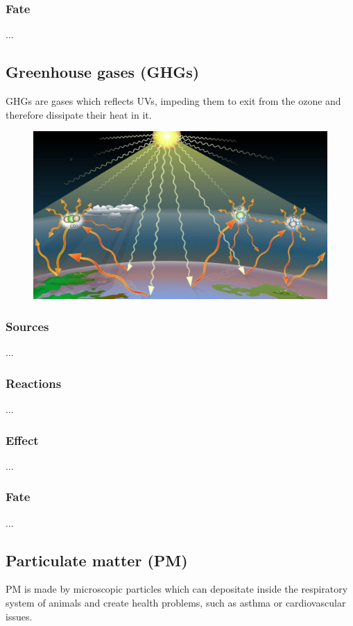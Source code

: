 \documentclass{article}
\newcommand{\cfig}[1]{%
  \begin{figure}[ht!]%
    \centering%
    #1%
  \end{figure}%
}
\begin{document}
\subsubsection{Fate}
... 

\subsection{Greenhouse gases (GHGs)}
GHGs are gases which reflects UVs, impeding them to exit from the ozone
and therefore dissipate their heat in it.

\cfig{\includegraphics*[width=.8\textwidth]{media/Treibhauseffekt-Graphik.jpg}}

\subsubsection{Sources}
...

\subsubsection{Reactions}
...

\subsubsection{Effect}
...

\subsubsection{Fate}
... 

\subsection{Particulate matter (PM)}
PM is made by microscopic particles which can depositate inside the
respiratory system of animals and create health problems, such as asthma
or cardiovascular issues.
\end{document}
